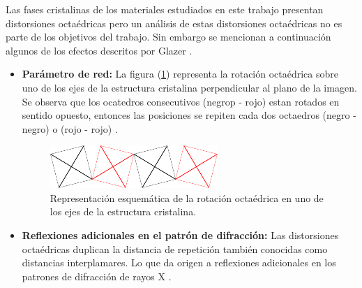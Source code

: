 \noindent Las fases cristalinas de los materiales estudiados en este trabajo presentan distorsiones octa\'edricas pero un an\'alisis de estas distorsiones octa\'edricas no es parte de los objetivos del trabajo. Sin embargo se mencionan a continuaci\'on algunos de los efectos descritos por Glazer .

\begin{itemize}
    \item {\bf Par\'ametro de red:} La figura (\ref{para_octa}) representa la rotaci\'on octa\'edrica sobre uno de los ejes de la estructura cristalina perpendicular al plano de la imagen. Se observa que los ocatedros consecutivos (negrop - rojo) estan rotados en sentido opuesto, entonces las posiciones se repiten cada dos octaedros (negro - negro) o (rojo - rojo) \cite{glazer1975}.
    \begin{figure}[H]
        \centering
        \includegraphics[width=0.6\textwidth]{contenido/marco_teorico/perovskitas/img_Perovskitas/rotacion_octaedrica.png}
        \caption[Rotaci\'on octa\'edrica]{Representaci\'on esquem\'atica de la 
            rotaci\'on octa\'edrica en uno de los ejes de la estructura cristalina.}
        \label{para_octa}
    \end{figure}
    \item {\bf Reflexiones adicionales en el patr\'on de difracci\'on:} Las distorsiones octa\'edricas duplican la distancia de repetici\'on tambi\'en conocidas como distancias interplamares. Lo que da origen a reflexiones adicionales en los patrones de difracci\'on de rayos X \cite{glazer1975}.
\end{itemize} 
